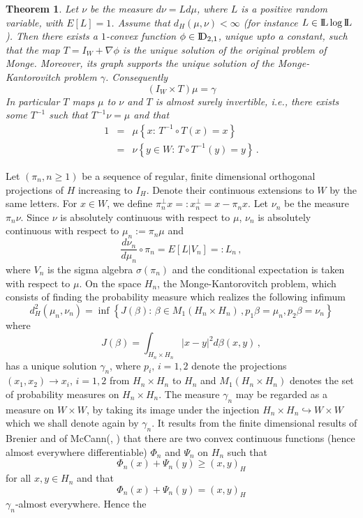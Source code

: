 \documentclass[12pt,a4paper]{book}
\newtheorem{theorem}{Theorem}[section]
\newcommand{\beaa}{\begin{eqnarray*}}
\newcommand{\eeaa}{\end{eqnarray*}}
\newcommand{\DD}{{\rm I\!D}}
\newcommand{\ga}{\gamma}
\newcommand{\LL}{{\rm I\!L}}
\newcommand{\proof}{\noindent {\bf Proof:\ }}
\begin{document}
\begin{theorem}
\label{gaussian-case}
Let $\nu$ be the measure $d\nu=Ld\mu$, where $L$ is a positive random variable,
with $E[L]=1$. Assume that $d_H(\mu,\nu)<\infty$ (for instance 
$L\in \LL\log \LL$). Then there exists a  $1$-convex function $\phi\in
\DD_{2,1}$, unique upto a constant,  such that  the map
$T=I_W+\nabla \phi$ is the unique solution of the original problem of
Monge. Moreover, its graph supports  the  unique
solution of the 
Monge-Kantorovitch problem $\ga$. Consequently    
$$
(I_W\times T)\mu=\ga
$$
In particular  $T$ maps $\mu$ to $\nu$ and  $T$ is almost surely
invertible, i.e., there exists some $T^{-1}$ such that $T^{-1}\nu=\mu$
and that 
\beaa
1&=&\mu\left\{x:\,T^{-1}\circ T(x)=x\right\}\\
&=&\nu\left\{y\in W:\,T\circ T^{-1}(y)=y\right\}\,.
\eeaa
\end{theorem}
\proof Let $(\pi_n,n\geq 1)$ be a sequence of regular, finite
dimensional orthogonal projections of $H$ increasing to $I_H$. Denote
their continuous extensions to $W$ by the same letters. For $x\in W$,
we define $\pi_n^\bot x=:x_n^\bot=x-\pi_nx$. Let  $\nu_n$ be  the measure
$\pi_n\nu$. Since $\nu$ is absolutely continuous with respect to
$\mu$, $\nu_n$ is absolutely continuous with respect to
$\mu_n:=\pi_n\mu$ and 
$$
\frac{d\nu_n}{d\mu_n}\circ\pi_n=E[L|V_n]=:L_n\,,
$$
where $V_n$ is the sigma algebra  $\sigma(\pi_n)$ and the conditional
expectation is taken with 
respect to $\mu$. On the space $H_n$, the  Monge-Kantorovitch
problem, which consists of finding the probability measure which
realizes the following infimum 
$$
d_H^2(\mu_n,\nu_n)=\inf\left\{J(\beta):\,\beta\in M_1(H_n\times
H_n)\,,p_1\beta=\mu_n,p_2\beta=\nu_n\right\} 
$$
where
$$
J(\beta)=\int_{H_n\times H_n}|x-y|^2d\beta(x,y)\,,
$$
has a unique solution $\ga_n$, where $p_i,\,i=1,2$ denote  the
projections  $(x_1,x_2)\to x_i,\,i=1,2$ from $H_n\times H_n$ to $H_n$
and $M_1(H_n\times H_n)$ denotes the set of probability measures on
$H_n\times H_n$.  The measure $\ga_n$ may be regarded
as a measure on $W\times W$, by taking its image under the injection
$H_n\times H_n\hookrightarrow W\times W$ which  we shall denote again by
$\ga_n$. It results from the finite dimensional results of Brenier and
of McCann(\cite{BRE}, \cite{Mc1}) that 
there are two convex continuous  functions (hence almost everywhere
differentiable) $\Phi_n$ and $\Psi_n$ on 
$H_n$ such that 
$$
\Phi_n(x)+\Psi_n(y)\geq (x,y)_H
$$
for all $x,y\in H_n$ and that 
$$
\Phi_n(x)+\Psi_n(y)= (x,y)_H
$$
$\ga_n$-almost everywhere. Hence the 
\end{document}
